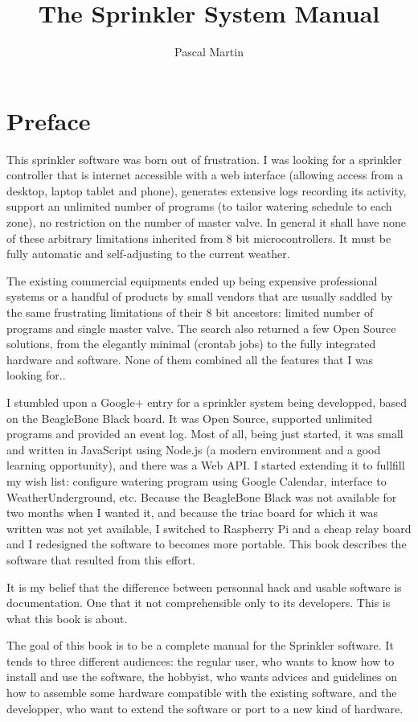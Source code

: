 \documentclass[11pt]{book}
\title{\textbf{The Sprinkler System Manual}}
\author{Pascal Martin}
\begin{document}
\frontmatter
\chapter{Preface}
This sprinkler software was born out of frustration. I was looking for a sprinkler controller that is internet accessible with a web interface (allowing access from a desktop, laptop tablet and phone), generates extensive logs recording its activity, support an unlimited number of programs (to tailor watering schedule to each zone), no restriction on the number of master valve. In general it shall have none of these arbitrary limitations inherited from 8 bit microcontrollers. It must be fully automatic and self-adjusting to the current weather.

The existing commercial equipments ended up being expensive professional systems or a handful of products by small vendors that are usually saddled by the same frustrating limitations of their 8 bit ancestors: limited number of programs and single master valve. The search also returned a few Open Source solutions, from the elegantly minimal (crontab jobs) to the fully integrated hardware and software. None of them combined all the features that I was looking for..

I stumbled upon a Google+ entry for a sprinkler system being developped, based on the BeagleBone Black board. It was Open Source, supported unlimited programs and provided an event log. Most of all, being just started, it was small and written in JavaScript using Node.js (a modern environment and a good learning opportunity), and there was a Web API. I started extending it to fullfill my wish list: configure watering program using Google Calendar, interface to WeatherUnderground, etc. Because the BeagleBone Black was not available for two months when I wanted it, and because the triac board for which it was written was not yet available, I switched to Raspberry Pi and a cheap relay board and I redesigned the software to becomes more portable. This book describes the software that resulted from this effort.

It is my belief that the difference between personnal hack and usable software is documentation. One that it not comprehensible only to its developers. This is what this book is about.

The goal of this book is to be a complete manual for the Sprinkler software. It tends to three different audiences: the regular user, who wants to know how to install and use the software, the hobbyist, who wants advices and guidelines on how to assemble some hardware compatible with the existing software, and the developper, who want to extend the software or port to a new kind of hardware.
\end{document}
